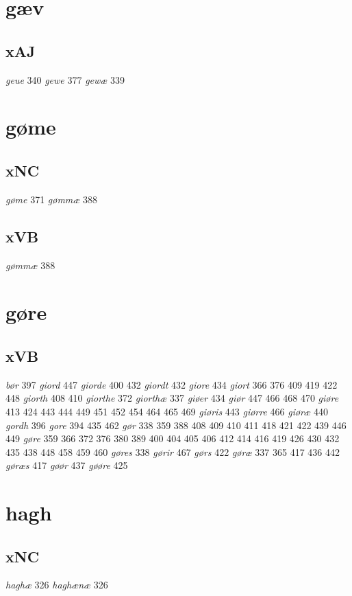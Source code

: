 \documentclass[a4paper,twocolumn]{article}
\begin{document}
\section{gæv}
\label{sec:org0dcf930}
\subsection{xAJ}
\label{sec:org9f267c0}
\emph{geue} 340 \emph{gewe} 377 \emph{gewæ} 339 
\section{gøme}
\label{sec:org72ad9eb}
\subsection{xNC}
\label{sec:orga1b42d1}
\emph{gøme} 371 \emph{gømmæ} 388 
\subsection{xVB}
\label{sec:orgd55f27e}
\emph{gømmæ} 388 
\section{gøre}
\label{sec:org3a173db}
\subsection{xVB}
\label{sec:org247f9f5}
\emph{bør} 397 \emph{giord} 447 \emph{giorde} 400 432 \emph{giordt} 432 \emph{giore} 434 \emph{giort} 366 376 409 419 422 448 \emph{giorth} 408 410 \emph{giorthe} 372 \emph{giorthæ} 337 \emph{giøer} 434 \emph{giør} 447 466 468 470 \emph{giøre} 413 424 443 444 449 451 452 454 464 465 469 \emph{giøris} 443 \emph{giørre} 466 \emph{giøræ} 440 \emph{gordh} 396 \emph{gore} 394 435 462 \emph{gør} 338 359 388 408 409 410 411 418 421 422 439 446 449 \emph{gøre} 359 366 372 376 380 389 400 404 405 406 412 414 416 419 426 430 432 435 438 448 458 459 460 \emph{gøres} 338 \emph{gørir} 467 \emph{gørs} 422 \emph{gøræ} 337 365 417 436 442 \emph{gøræs} 417 \emph{gøør} 437 \emph{gøøre} 425 
\section{hagh}
\label{sec:orge9e3119}
\subsection{xNC}
\label{sec:org53750c3}
\emph{haghæ} 326 \emph{haghænæ} 326 
\end{document}
